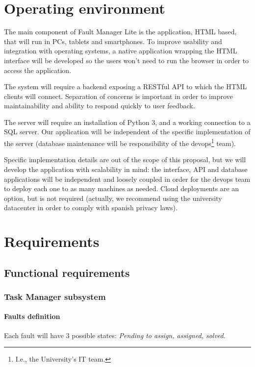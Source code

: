 \section{Operating environment}

The main component of Fault Manager Lite is the application, HTML based, that will run in PCs, tablets and smartphones. To improve usability and integration with operating systems, a native application wrapping the HTML interface will be developed so the users won't need to run the browser in order to access the application.

The system will require a backend exposing a RESTful API to which the HTML clients will connect. Separation of concerns is important in order to improve maintainability and ability to respond quickly to user feedback.

The server will require an installation of Python 3, and a working connection to a SQL server. Our application will be independent of the specific implementation of the server (database maintenance will be responsibility of the devops\footnote{I.e., the University's IT team.} team).

Specific implementation details are out of the scope of this proposal, but we will develop the application with scalability in mind: the interface, API and database applications will be independent and loosely coupled in order for the devops team to deploy each one to as many machines as needed. Cloud deployments are an option, but is not required (actually, we recommend using the university datacenter in order to comply with spanish privacy laws).

\section{Requirements}

\subsection{Functional requirements}

\subsubsection{Task Manager subsystem}

\paragraph{Faults definition} Each fault will have 3 possible states: \textit{Pending to assign, assigned, solved}.

